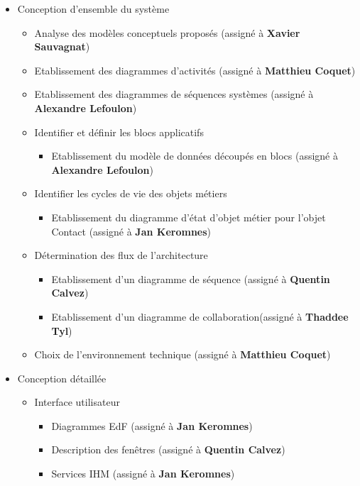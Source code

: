 \begin{itemize}
\item Conception d'ensemble du système

\begin{itemize}
\item Analyse des modèles conceptuels proposés (assigné à \textbf{Xavier Sauvagnat})
\item Etablissement des diagrammes d'activités (assigné à \textbf{Matthieu Coquet})
\item Etablissement des diagrammes de séquences systèmes (assigné à \textbf{Alexandre Lefoulon})
\item Identifier et définir les blocs applicatifs

\begin{itemize}
\item Etablissement du modèle de données découpés en blocs (assigné à \textbf{Alexandre Lefoulon})
\end{itemize}

\item Identifier les cycles de vie des objets métiers

\begin{itemize}
\item Etablissement du diagramme d'état d'objet métier pour l'objet Contact (assigné à \textbf{Jan Keromnes})
\end{itemize}

\item Détermination des flux de l'architecture

\begin{itemize}
\item Etablissement d'un diagramme de séquence (assigné à \textbf{Quentin Calvez})
\item Etablissement d'un diagramme de collaboration(assigné à \textbf{Thaddee Tyl})
\end{itemize}

\item Choix de l'environnement technique (assigné à \textbf{Matthieu Coquet})

\end{itemize}
\item Conception détaillée

\begin{itemize}
\item Interface utilisateur

\begin{itemize}
\item Diagrammes EdF (assigné à \textbf{Jan Keromnes})
\item Description des fenêtres (assigné à \textbf{Quentin Calvez})
\item Services IHM (assigné à \textbf{Jan Keromnes})
\end{itemize}


\end{itemize}
\end{itemize}

